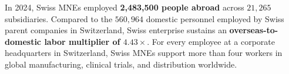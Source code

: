 \begin{remarkbox}
In 2024, Swiss MNEs employed \textbf{2,483,500 people abroad} across $21,265$ subsidiaries. Compared to the $560,964$ domestic personnel employed by Swiss parent companies in Switzerland, Swiss enterprise sustains an \textbf{overseas-to-domestic labor multiplier of $4.43\times$}. For every employee at a corporate headquarters in Switzerland, Swiss MNEs support more than four workers in global manufacturing, clinical trials, and distribution worldwide.
\end{remarkbox}

